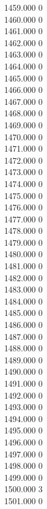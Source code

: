 { 1459.000	0 \\
 1460.000	0 \\
 1461.000	0 \\
 1462.000	0 \\
 1463.000	0 \\
 1464.000	0 \\
 1465.000	0 \\
 1466.000	0 \\
 1467.000	0 \\
 1468.000	0 \\
 1469.000	0 \\
 1470.000	0 \\
 1471.000	0 \\
 1472.000	0 \\
 1473.000	0 \\
 1474.000	0 \\
 1475.000	0 \\
 1476.000	0 \\
 1477.000	0 \\
 1478.000	0 \\
 1479.000	0 \\
 1480.000	0 \\
 1481.000	0 \\
 1482.000	0 \\
 1483.000	0 \\
 1484.000	0 \\
 1485.000	0 \\
 1486.000	0 \\
 1487.000	0 \\
 1488.000	0 \\
 1489.000	0 \\
 1490.000	0 \\
 1491.000	0 \\
 1492.000	0 \\
 1493.000	0 \\
 1494.000	0 \\
 1495.000	0 \\
 1496.000	0 \\
 1497.000	0 \\
 1498.000	0 \\
 1499.000	0 \\
 1500.000	3 \\
 1501.000	0 \\
}

